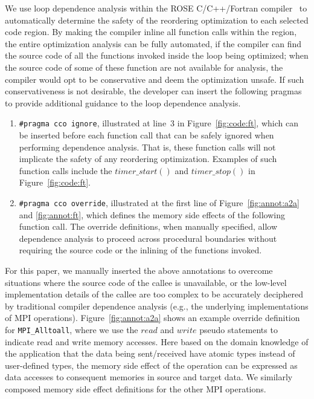 We use loop dependence analysis within the ROSE C/C++/Fortran compiler~\cite {ROSE} to automatically 
determine the safety of the reordering optimization to each selected code
region. By making the compiler inline all function calls within the region, the entire optimization analysis can be fully automated, if the compiler can find the source code of all the functions invoked inside the loop being optimized; when the source code of some of these function are not available for analysis, the compiler would opt to be conservative and deem the optimization unsafe. If such conservativeness is not desirable, the developer can 
insert the following pragmas to provide additional guidance to the loop dependence analysis. 

\begin{enumerate}

\item \texttt{\#pragma cco ignore}, illustrated at line~3 in
  Figure~\ref{fig:code:ft}, which can be inserted before each
  function call that can be safely ignored when performing dependence
  analysis. That is, these function calls will not implicate the
  safety of any reordering optimization.
  Examples of such function calls include the
  $timer\_start()$ and $timer\_stop()$ in Figure~\ref{fig:code:ft}.

\item \texttt{\#pragma cco override}, illustrated at the first line of
  Figure~\ref{fig:annot:a2a} and \ref{fig:annot:ft}, which defines the
  memory side effects of the following function call.  The override
  definitions, when manually specified, allow dependence analysis to proceed
  across procedural boundaries without requiring the source code or the inlining of the functions invoked. 

\end{enumerate}

For this paper, we manually inserted the above annotations to overcome situations where the source code of the callee is unavailable, 
or the low-level
implementation details of the callee are too complex to be accurately
deciphered by traditional compiler dependence analysis (e.g., the underlying implementations of MPI operations). 
Figure~\ref{fig:annot:a2a}
shows an example override definition for \texttt{MPI\_Alltoall}, where we use the $read$ and $write$ pseudo statements to indicate
read and write memory accesses.  Here based on the domain knowledge of the
application that the data being sent/received have atomic types instead of
user-defined types, the memory side effect of the operation can be expressed as data
accesses to consequent memories in source and target data. We similarly composed
  memory side effect definitions for the other MPI operations. 

